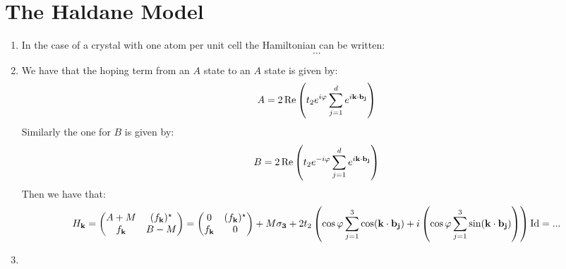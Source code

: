 \documentclass[10pt,a4paper]{article}
\begin{document}
\section{The Haldane Model}

\begin{enumerate}

\item In the case of a crystal with one atom per unit cell the Hamiltonian can be written:
\[
...
\]

\item We have that the hoping term from an $A$ state to an $A$ state is given by:
\[
A = 2 \Re\left(t_2 e^{i \varphi} \sum_{j = 1}^d e^{i \vb{k} \cdot \vb{b_j}}\right)
\]
Similarly the one for $B$ is given by:
\[
B = 2\Re\left(t_2 e^{-i\varphi} \sum_{j = 1}^d e^{i \vb{k} \cdot \vb{b_j}}\right)
\]
Then we have that:
\[
H_{\vb{k}} = \begin{pmatrix}
A + M & (f_{\vb{k}})^\star\\
f_{\vb{k}} & B - M
\end{pmatrix} = \begin{pmatrix}
0 & (f_{\vb{k}})^\star\\
f_{\vb{k}} & 0
\end{pmatrix} + M \vb{\sigma_3} + 2 t_2 \left(\cos\varphi \sum_{j = 1}^3 \cos(\vb{k} \cdot \vb{b_j}) + i \left( \cos\varphi \sum_{j = 1}^3 \sin(\vb{k} \cdot \vb{b_j}) \right) 
\right)\text{Id} = ...
\]

\item 

\end{enumerate}
\end{document}
